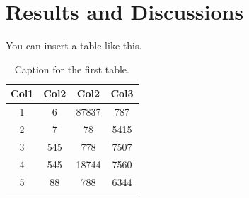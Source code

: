 \chapter{Results and Discussions}
\label{chap:experiments_and_results}
You can insert a table like this.

\begin{table}[h!]
\centering
\begin{tabular}{c|c|c|c} 
 \hline
 \bf Col1 & \bf Col2 & \bf Col2 & \bf Col3 \\  
 \hline\hline
 1 & 6 & 87837 & 787 \\ 
 \hline
 2 & 7 & 78 & 5415 \\
 \hline
 3 & 545 & 778 & 7507 \\
 \hline
 4 & 545 & 18744 & 7560 \\
 \hline
 5 & 88 & 788 & 6344 \\  
 \hline
\end{tabular}
\caption{Caption for the first table.}
\label{table:1}
\end{table}